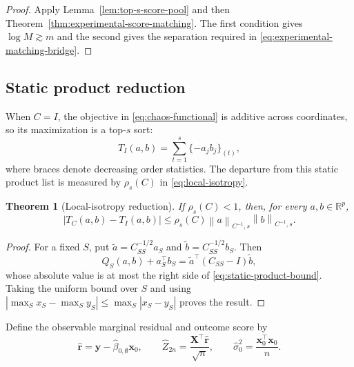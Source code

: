 \documentclass[a4paper,11pt,english]{article}
\newtheorem{theorem}{Theorem}[section]
\newcommand{\norm}[1]{\left\lVert #1\right\rVert}
\newcommand{\R}{\mathbb R}
\begin{document}
\begin{proof}
Apply Lemma~\ref{lem:top-s-score-pool} and then
Theorem~\ref{thm:experimental-score-matching}.  The first condition gives
$\log M\gtrsim m$ and the second gives the separation required in
\eqref{eq:experimental-matching-bridge}.
\end{proof}

\subsection{Static product reduction}

When $C=I$, the objective in \eqref{eq:chaos-functional} is additive
across coordinates, so its maximization is a top-$s$ sort:
\begin{equation}\label{eq:top-s-products}
        T_I(a,b)
        =\sum_{t=1}^s\{-a_jb_j\}_{(t)},
\end{equation}
where braces denote decreasing order statistics.  The departure from
this static product list is measured by $\rho_s(C)$ in
\eqref{eq:local-isotropy}.
\begin{theorem}[Local-isotropy reduction]\label{thm:static-products}
If $\rho_s(C)<1$, then, for every $a,b\in\R^p$,
\begin{equation}\label{eq:static-product-bound}
        |T_C(a,b)-T_I(a,b)|
        \le\rho_s(C)\norm{a}_{C^{-1},s}\norm{b}_{C^{-1},s}.
\end{equation}
\end{theorem}

\begin{proof}
For a fixed $S$, put
$\widetilde a=C_{SS}^{-1/2}a_S$ and
$\widetilde b=C_{SS}^{-1/2}b_S$.  Then
\begin{equation*}
        Q_S(a,b)+a_S^\top b_S
        =\widetilde a^\top(C_{SS}-I)\widetilde b,
\end{equation*}
whose absolute value is at most the right side of
\eqref{eq:static-product-bound}.  Taking the uniform bound over $S$ and
using $|\max_S x_S-\max_S y_S|\le\max_S|x_S-y_S|$ proves the result.
\end{proof}

Define the observable marginal residual and outcome score by
\begin{equation}\label{eq:observable-outcome-score}
 \hat{\mathbf r}=\mathbf y-\hat\beta_{0,\emptyset}\mathbf x_0,
 \qquad
 \hat Z_{2n}=\frac{\mathbf X^\top\hat{\mathbf r}}{\sqrt n},
 \qquad
 \hat\sigma_0^2=\frac{\mathbf x_0^\top\mathbf x_0}{n}.
\end{equation}
\end{document}
